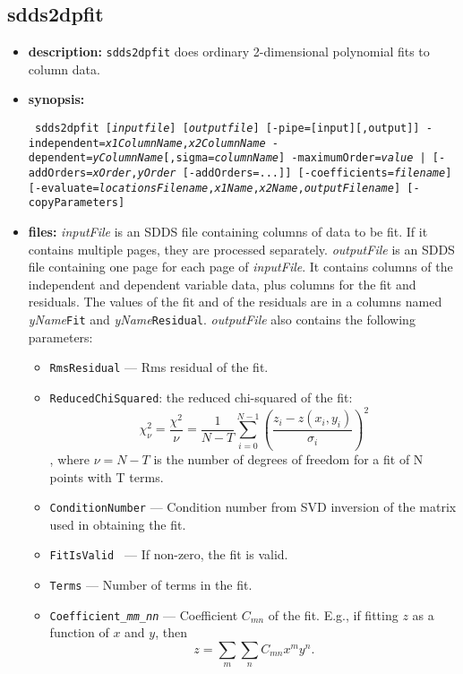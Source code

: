 \newpage
\subsection{sdds2dpfit}
\label{sdds2dpfit}

\begin{itemize}
\item {\bf description:} 
{\tt sdds2dpfit} does ordinary 2-dimensional polynomial fits to column data.
\item {\bf synopsis:} 
\begin{flushleft}{\tt
sdds2dpfit [{\em inputfile}] [{\em outputfile}] [-pipe=[input][,output]]
  -independent={\em x1ColumnName},{\em x2ColumnName} -dependent={\em yColumnName}[,sigma={\em columnName}]
  {-maximumOrder={\em value} |  [-addOrders={\em xOrder},{\em yOrder} [-addOrders=...]]}
  [-coefficients={\em filename}] [-evaluate={\em locationsFilename},{\em x1Name},{\em x2Name},{\em outputFilename}]
  [-copyParameters]
}\end{flushleft}
\item {\bf files:}
{\em inputFile} is an SDDS file containing columns of data to be fit.  If it contains multiple pages, they are processed
separately.  {\em outputFile} is an SDDS file containing one page for each page of {\em inputFile}.  It contains columns of
the independent and dependent variable data, plus columns for the fit and residuals.   The values of the fit
and of the residuals are in a columns named {\em yName}{\tt Fit} and {\em yName}{\tt Residual}.  {\em outputFile} also contains the
following parameters:
\begin{itemize}
\item {\tt RmsResidual} --- Rms residual of the fit.
\item {\tt ReducedChiSquared}: the reduced chi-squared of the fit:
  $$ \chi^2_\nu = \frac{\chi^2}{\nu} = \frac{1}{N-T}\sum_{i=0}^{N-1} \left(\frac{z_i - z(x_i, y_i)}{\sigma_i}\right)^2 $$,
  where $\nu = N-T$ is the number of degrees of freedom for a fit of N points with T terms.
\item {\tt ConditionNumber} --- Condition number from SVD inversion of the matrix used in obtaining the fit.
\item {\tt FitIsValid } --- If non-zero, the fit is valid.
\item {\tt Terms} --- Number of terms in the fit.
\item {\tt Coefficient\_{\em mm}\_{\em nn}} --- Coefficient $C_{mn}$ of the fit. E.g., if fitting $z$ as a function of $x$ and
  $y$, then
  \begin{equation}
    z = \sum_m \sum_n C_{mn} x^m y^n.
  \end{equation}
\end{itemize}


\end{itemize}

